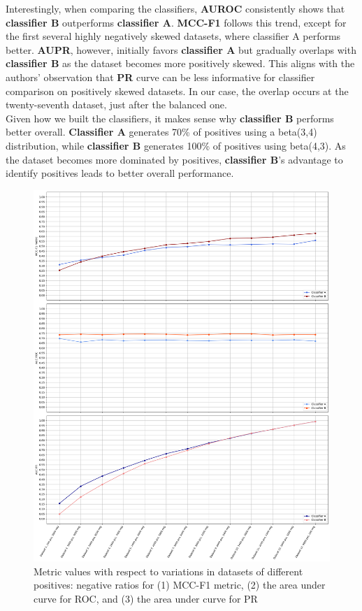 \documentclass[12pt, oneside]{amsart}
\theoremstyle{definition}
\theoremstyle{remark}
\numberwithin{equation}{section}
\begin{document}
Interestingly, when comparing the classifiers, \textbf{AUROC} consistently shows that \textbf{classifier B} outperforms \textbf{classifier A}. \textbf{MCC-F1} follows this trend, except for the first several highly negatively skewed datasets, where classifier A performs better. \textbf{AUPR}, however, initially favors \textbf{classifier A} but gradually overlaps with \textbf{classifier B} as the dataset becomes more positively skewed. This aligns with the authors' observation that \textbf{PR} curve can be less informative for classifier comparison on positively skewed datasets. In our case, the overlap occurs at the twenty-seventh dataset, just after the balanced one.\\

Given how we built the classifiers, it makes sense why \textbf{classifier B} performs better overall. \textbf{Classifier A} generates 70\% of positives using a beta(3,4) distribution, while \textbf{classifier B} generates 100\% of positives using beta(4,3). As the dataset becomes more dominated by positives, \textbf{classifier B}'s advantage to identify positives leads to better overall performance.\\

\begin{figure}
    \centering
    \includegraphics[scale=0.28]{Report/Figure/simulation1.jpg}
    \caption{Metric values with respect to variations in datasets of different positives: negative ratios for (1) MCC-F1 metric, (2) the area under curve for ROC, and (3) the area under curve for PR}
    \label{simulation1}
\end{figure}
\end{document}
